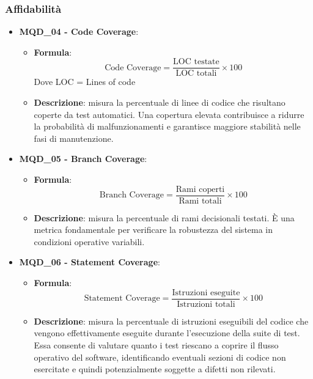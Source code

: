 \subsubsection{Affidabilità}
\begin{itemize}
\item \textbf{MQD\_04 - Code Coverage}:
    \begin{itemize}
        \item \textbf{Formula}:
        \[
            \text{Code Coverage} =
            \frac{\text{LOC testate}}{\text{LOC totali}} \times 100
        \]
		Dove LOC = Lines of code
        \item \textbf{Descrizione}: misura la percentuale di linee di codice che risultano coperte da test automatici. Una copertura elevata contribuisce a ridurre la probabilità di malfunzionamenti e garantisce maggiore stabilità nelle fasi di manutenzione.
    \end{itemize}

\item \textbf{MQD\_05 - Branch Coverage}:
    \begin{itemize}
        \item \textbf{Formula}:
        \[
            \text{Branch Coverage} =
            \frac{\text{Rami coperti}}{\text{Rami totali}} \times 100
        \]
        \item \textbf{Descrizione}: misura la percentuale di rami decisionali testati. È una metrica fondamentale per verificare la robustezza del sistema in condizioni operative variabili.
    \end{itemize}

\item \textbf{MQD\_06 - Statement Coverage}:
    \begin{itemize}
        \item \textbf{Formula}:
        \[
            \text{Statement Coverage} =
            \frac{\text{Istruzioni eseguite}}{\text{Istruzioni totali}} \times 100
        \]
        \item \textbf{Descrizione}: misura la percentuale di istruzioni eseguibili del codice che vengono effettivamente eseguite durante l’esecuzione della suite di test. Essa consente di valutare quanto i test riescano a coprire il flusso operativo del software, identificando eventuali sezioni di codice non esercitate e quindi potenzialmente soggette a difetti non rilevati.
    \end{itemize}
\end{itemize}

